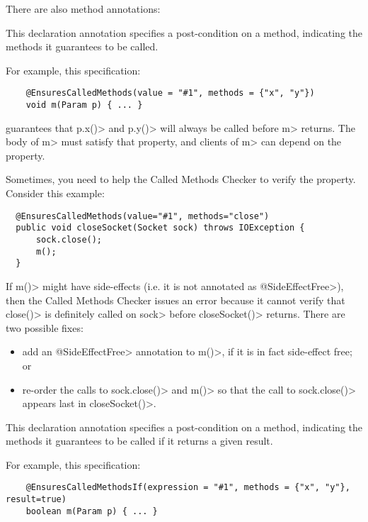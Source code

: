 There are also method annotations:

\begin{description}
\label{called-methods-ensurescalledmethods}
\item[\refqualclass{checker/calledmethods/qual}{EnsuresCalledMethods}]
  This declaration annotation specifies a post-condition on a method, indicating the methods it
  guarantees to be called.

  For example, this specification:

  \begin{Verbatim}
    @EnsuresCalledMethods(value = "#1", methods = {"x", "y"})
    void m(Param p) { ... }
  \end{Verbatim}

  guarantees that \<p.x()> and \<p.y()> will always be called before \<m> returns.
  The body of \<m> must satisfy that property, and clients of \<m> can depend on the property.

  Sometimes, you need to help the Called Methods Checker to verify the property.
  Consider this example:
  \begin{Verbatim}
  @EnsuresCalledMethods(value="#1", methods="close")
  public void closeSocket(Socket sock) throws IOException {
      sock.close();
      m();
  }
  \end{Verbatim}

  If \<m()> might have side-effects (i.e. it is not annotated as
  \<@SideEffectFree>), then the Called Methods Checker issues an error because
  it cannot verify that \<close()> is definitely called on \<sock> before
  \<closeSocket()> returns. There are two possible fixes:

  \begin{itemize}
  \item add an \<@SideEffectFree> annotation to \<m()>, if it is in fact side-effect free; or
  \item re-order the calls to \<sock.close()> and \<m()> so that the call to \<sock.close()> appears
  last in \<closeSocket()>.
  \end{itemize}

\item[\refqualclass{checker/calledmethods/qual}{EnsuresCalledMethodsIf}]
  This declaration annotation specifies a post-condition on a method, indicating the methods it
  guarantees to be called if it returns a given result.

  For example, this specification:

  \begin{Verbatim}
    @EnsuresCalledMethodsIf(expression = "#1", methods = {"x", "y"}, result=true)
    boolean m(Param p) { ... }
  \end{Verbatim}


\end{description}
